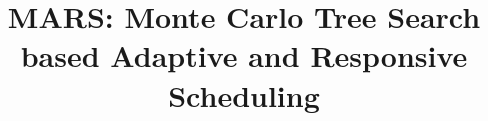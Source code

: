 \documentclass[conference]{IEEEtran}
\begin{document}
%
\title{MARS: Monte Carlo Tree Search based Adaptive and Responsive Scheduling}



\author{}
\end{document}
